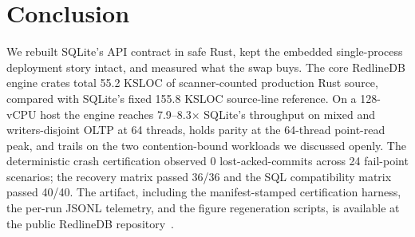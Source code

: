 \section{Conclusion}\label{sec:conclusion}

We rebuilt SQLite's API contract in safe Rust, kept the embedded
single-process deployment story intact, and measured what the swap
buys. The core RedlineDB engine crates total 55.2 KSLOC of scanner-counted
production Rust source, compared with SQLite's fixed 155.8 KSLOC
source-line reference.
On a 128-vCPU host the engine reaches 7.9--8.3$\times$
SQLite's throughput on mixed and writers-disjoint OLTP at 64 threads,
holds parity at the 64-thread point-read peak, and trails on the two
contention-bound workloads we discussed openly. The deterministic
crash certification observed 0 lost-acked-commits across 24
fail-point scenarios; the recovery matrix passed 36/36 and the SQL
compatibility matrix passed 40/40. The artifact, including the
manifest-stamped certification harness, the per-run JSONL telemetry,
and the figure regeneration scripts, is available at the public
RedlineDB repository~\cite{redlinedb}.
